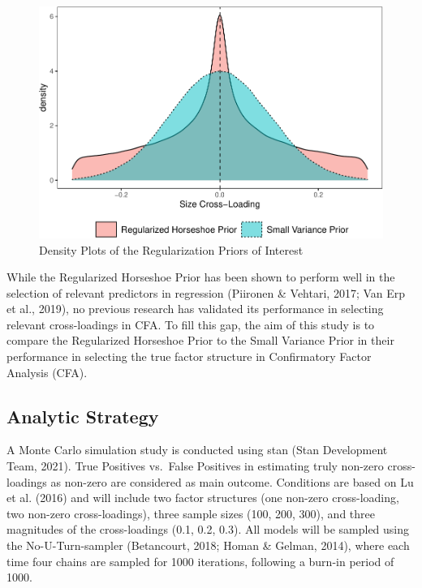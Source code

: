 \documentclass[
  english,
  man]{apa6}
\begin{document}
\begin{figure}
\centering
\includegraphics{JMBKoch_Proposal_files/figure-latex/unnamed-chunk-1-1.pdf}
\caption{\label{fig:unnamed-chunk-1}Density Plots of the Regularization Priors of Interest}
\end{figure}

While the Regularized Horseshoe Prior has been shown to perform well in
the selection of relevant predictors in regression
(Piironen \& Vehtari, 2017; Van Erp et al., 2019), no previous research
has validated its performance in selecting relevant cross-loadings in
CFA. To fill this gap, the aim of this study is to compare the
Regularized Horseshoe Prior to the Small Variance Prior in their
performance in selecting the true factor structure in Confirmatory
Factor Analysis (CFA).

\hypertarget{analytic-strategy}{%
\subsection{Analytic Strategy}\label{analytic-strategy}}

A Monte Carlo simulation study is conducted using stan
(Stan Development Team, 2021). True Positives vs.~False Positives
in estimating truly non-zero cross-loadings as non-zero are considered
as main outcome. Conditions are based on Lu et al. (2016) and will
include two factor structures (one non-zero cross-loading, two
non-zero cross-loadings), three sample sizes (100, 200, 300), and three
magnitudes of the cross-loadings (0.1, 0.2, 0.3). All models will be sampled
using the No-U-Turn-sampler (Betancourt, 2018; Homan \& Gelman, 2014), where each time four chains are sampled
for 1000 iterations, following a burn-in period of 1000.
\end{document}

